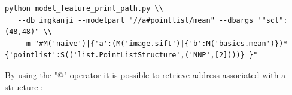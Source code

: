 \documentclass{report}
\begin{document}
\begin{lstlisting}
python model_feature_print_path.py \\
   --db imgkanji --modelpart "//a#pointlist/mean" --dbargs '"scl":(48,48)' \\
    -m "#M('naive')|{'a':(M('image.sift')|{'b':M('basics.mean')})*{'pointlist':S(('list.PointListStructure',('NNP',[2])))} }"

\end{lstlisting}




By using the "@" operator it is possible to retrieve address associated with a structure :
\end{document}

